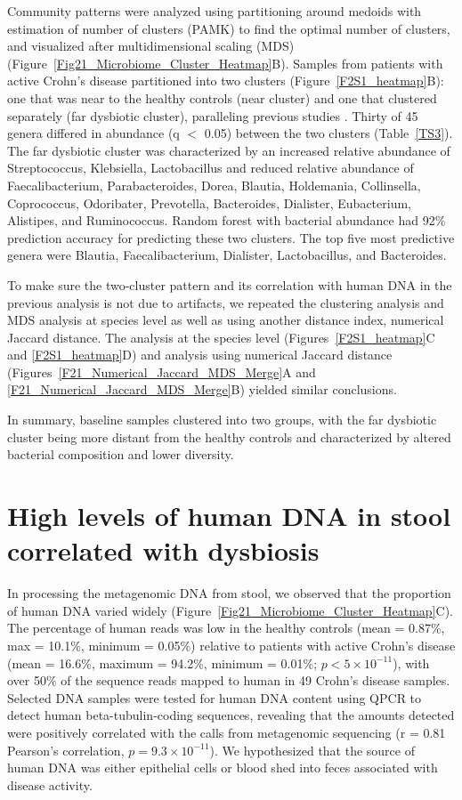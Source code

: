 Community patterns were analyzed using partitioning around medoids with estimation of number of clusters (PAMK) to find the optimal number of clusters, and visualized after multidimensional scaling (MDS) (Figure~\ref{Fig21_Microbiome_Cluster_Heatmap}B). Samples from patients with active Crohn's disease partitioned into two clusters (Figure~\ref{F2S1_heatmap}B): one that was near to the healthy controls (near cluster) and one that clustered separately (far dysbiotic cluster), paralleling previous studies \citep{Frank:2007hn, gevers2014treatment}. Thirty of 45 genera differed in abundance (q $<$ 0.05) between the two clusters (Table~\ref{TS3}). The far dysbiotic cluster was characterized by an increased relative abundance of Streptococcus, Klebsiella, Lactobacillus and reduced relative abundance of Faecalibacterium, Parabacteroides, Dorea, Blautia, Holdemania, Collinsella, Coprococcus, Odoribater, Prevotella, Bacteroides, Dialister, Eubacterium, Alistipes, and Ruminococcus. Random forest with bacterial abundance had 92\% prediction accuracy for predicting these two clusters. The top five most predictive genera were Blautia, Faecalibacterium, Dialister, Lactobacillus, and Bacteroides. 

To make sure the two-cluster pattern and its correlation with human DNA in the previous analysis is not due to artifacts, we repeated the clustering analysis and  MDS analysis at species level as well as using another distance index, numerical Jaccard distance. The analysis at the species level (Figures~\ref{F2S1_heatmap}C and \ref{F2S1_heatmap}D) and analysis using numerical Jaccard distance (Figures~\ref{F21_Numerical_Jaccard_MDS_Merge}A and \ref{F21_Numerical_Jaccard_MDS_Merge}B) yielded similar conclusions. 


In summary, baseline samples clustered into two groups, with the far dysbiotic cluster being more distant from the healthy controls and characterized by altered bacterial composition and lower diversity.





\section{High levels of human DNA in stool correlated with dysbiosis}
In processing the metagenomic DNA from stool, we observed that the proportion of human DNA varied widely (Figure~\ref{Fig21_Microbiome_Cluster_Heatmap}C). The percentage of human reads was low in the healthy controls (mean = 0.87\%, max = 10.1\%, minimum = 0.05\%) relative to patients with active Crohn's disease (mean = 16.6\%, maximum = 94.2\%, minimum = 0.01\%; $p < 5 \times 10^{-11}$), with over 50\% of the sequence reads mapped to human in 49 Crohn's disease samples. Selected DNA samples were tested for human DNA content using QPCR to detect human beta-tubulin-coding sequences, revealing that the amounts detected were positively correlated with the calls from metagenomic sequencing (r = 0.81 Pearson's correlation, $p = 9.3 \times 10^{-11}$). We hypothesized that the source of human DNA was either epithelial cells or blood shed into feces associated with disease activity.


